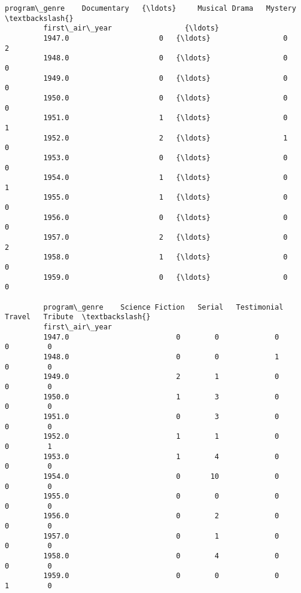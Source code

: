 \documentclass[11pt]{article}
\begin{document}
\begin{Verbatim}[commandchars=\\\{\}]
         program\_genre    Documentary   {\ldots}     Musical Drama   Mystery  \textbackslash{}
         first\_air\_year                 {\ldots}                               
         1947.0                     0   {\ldots}                 0         2   
         1948.0                     0   {\ldots}                 0         0   
         1949.0                     0   {\ldots}                 0         0   
         1950.0                     0   {\ldots}                 0         0   
         1951.0                     1   {\ldots}                 0         1   
         1952.0                     2   {\ldots}                 1         0   
         1953.0                     0   {\ldots}                 0         0   
         1954.0                     1   {\ldots}                 0         1   
         1955.0                     1   {\ldots}                 0         0   
         1956.0                     0   {\ldots}                 0         0   
         1957.0                     2   {\ldots}                 0         2   
         1958.0                     1   {\ldots}                 0         0   
         1959.0                     0   {\ldots}                 0         0   
         
         program\_genre    Science Fiction   Serial   Testimonial   Travel   Tribute  \textbackslash{}
         first\_air\_year                                                               
         1947.0                         0        0             0        0         0   
         1948.0                         0        0             1        0         0   
         1949.0                         2        1             0        0         0   
         1950.0                         1        3             0        0         0   
         1951.0                         0        3             0        0         0   
         1952.0                         1        1             0        0         1   
         1953.0                         1        4             0        0         0   
         1954.0                         0       10             0        0         0   
         1955.0                         0        0             0        0         0   
         1956.0                         0        2             0        0         0   
         1957.0                         0        1             0        0         0   
         1958.0                         0        4             0        0         0   
         1959.0                         0        0             0        1         0   
         

\end{Verbatim}
\end{document}
